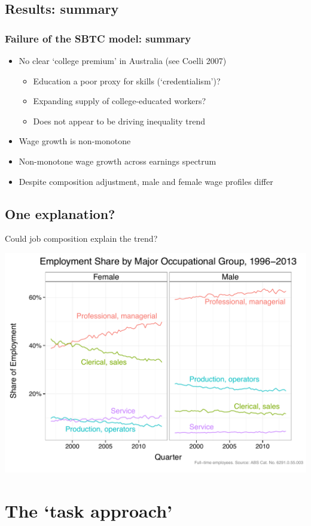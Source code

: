\documentclass[red]{beamer}
\newcommand{\vitem}{\vfill\item}
\begin{document}
\subsection{Results: summary}
\begin{frame}
  \frametitle{Failure of the SBTC model: summary}
  \begin{itemize}
  \vitem No clear `college premium' in Australia (see Coelli 2007)
  \begin{itemize}
  \vitem Education a poor proxy for skills (`credentialism')?
  \vitem Expanding supply of college-educated workers?
  \vitem Does not appear to be driving inequality trend
  \end{itemize}
  \pause
  \vitem Wage growth is non-monotone
  \vitem Non-monotone wage growth across earnings spectrum
  \pause
  \vitem Despite composition adjustment, male and female wage profiles differ
  \end{itemize}
\end{frame}

\subsection{One explanation?}
\begin{frame}{Could job composition explain the trend?}
  \begin{center}
    \includegraphics[width=\textwidth]{slides_fig/occ_share_sex.pdf}
  \end{center}
\end{frame}

\section{The `task approach'}
\end{document}
